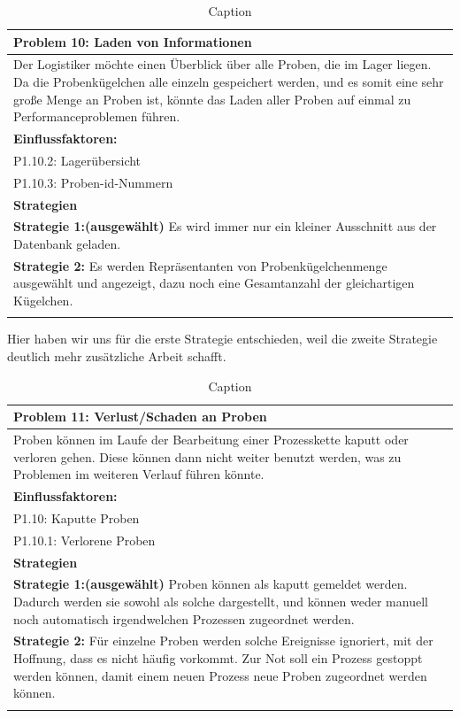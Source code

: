 \documentclass[enabledeprecatedfontcommands,fontsize=12pt,paper=a4,twoside]{scrartcl}
\begin{document}
\begin{table}[H]
    \centering
    \begin{tabular}{|p{15cm}|}
    \hline
          \textbf{Problem 10:} Laden von Informationen
          \\ \hline
          Der Logistiker möchte einen Überblick über alle Proben, die im Lager liegen. Da die Probenkügelchen alle einzeln gespeichert werden, und es somit eine sehr große Menge an Proben ist, könnte das Laden aller Proben auf einmal zu Performanceproblemen führen.
          \\ \hline
          \textbf{Einflussfaktoren: } \\
          P1.10.2: Lagerübersicht \\
	 P1.10.3: Proben-id-Nummern \\
          \hline
          \textbf{Strategien} \\ \hline
          \textbf{Strategie 1:(ausgewählt)} Es wird immer nur ein kleiner Ausschnitt aus der Datenbank geladen. \\
         \textbf{Strategie 2:} Es werden Repräsentanten von Probenkügelchenmenge ausgewählt und angezeigt, dazu noch eine Gesamtanzahl der gleichartigen Kügelchen. \\
          \\ \hline
    \end{tabular}
    \caption{Caption}
    \label{tab:my_label}
\end{table}
Hier haben wir uns für die erste Strategie entschieden, weil die zweite Strategie deutlich mehr zusätzliche Arbeit schafft. \\
\begin{table}[H]
    \centering
    \begin{tabular}{|p{15cm}|}
    \hline
          \textbf{Problem 11:} Verlust/Schaden an Proben
          \\ \hline
          Proben können im Laufe der Bearbeitung einer Prozesskette kaputt oder verloren gehen. Diese können dann nicht weiter benutzt werden, was zu Problemen im weiteren Verlauf führen könnte.
          \\ \hline
          \textbf{Einflussfaktoren: } \\
          P1.10: Kaputte Proben\\
          P1.10.1: Verlorene Proben \\
          \hline
          \textbf{Strategien} \\ \hline
          \textbf{Strategie 1:(ausgewählt)} Proben können als kaputt gemeldet werden. Dadurch werden sie sowohl als solche dargestellt, und können weder manuell noch automatisch irgendwelchen Prozessen zugeordnet werden. \\
          \textbf{Strategie 2:} Für einzelne Proben werden solche Ereignisse ignoriert, mit der Hoffnung, dass es nicht häufig vorkommt. Zur Not soll ein Prozess gestoppt werden können, damit einem neuen Prozess neue Proben zugeordnet werden können. \\
          \\ \hline
    \end{tabular}
    \caption{Caption}
    \label{tab:my_label}
\end{table}
\end{document}
